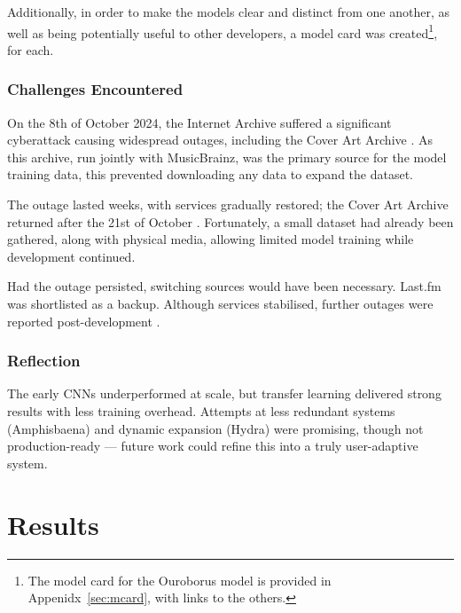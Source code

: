                 Additionally, in order to make the models clear and distinct from one another, as well as being potentially useful to other developers, a model card \cite{Mitchell_2019} was created\footnote{The model card for the Ouroborus model is provided in Appenidx~\ref{sec:mcard}, with links to the others.}, for each.
            
            \subsubsection{Challenges Encountered}
    
                On the 8th of October 2024, the Internet Archive suffered a significant cyberattack causing widespread outages, including the Cover Art Archive \cite{forbes2024}. As this archive, run jointly with MusicBrainz, was the primary source for the model training data, this prevented downloading any data to expand the dataset.
    
                The outage lasted weeks, with services gradually restored; the Cover Art Archive returned after the 21st of October \cite{archiveBlog2024}. Fortunately, a small dataset had already been gathered, along with physical media, allowing limited model training while development continued.
    
                Had the outage persisted, switching sources would have been necessary. Last.fm was shortlisted as a backup. Although services stabilised, further outages were reported post-development \cite{hackread2024}.
    
            \subsubsection*{Reflection}
                The early CNNs underperformed at scale, but transfer learning delivered strong results with less training overhead. Attempts at less redundant systems (Amphisbaena) and dynamic expansion (Hydra) were promising, though not production-ready — future work could refine this into a truly user-adaptive system.
    
    \section{Results} %
    
